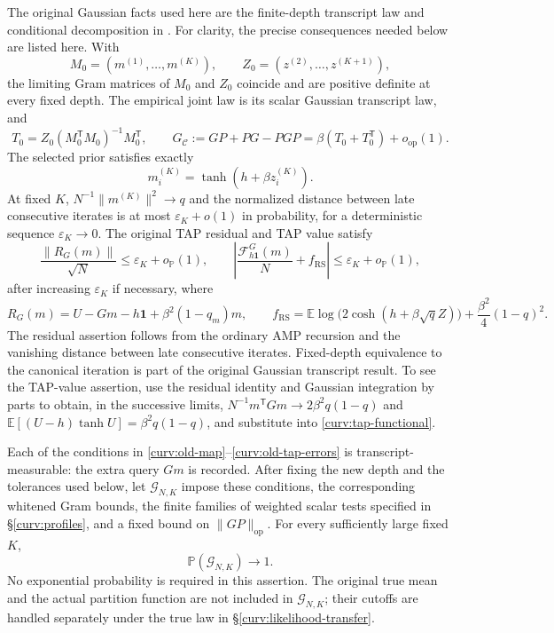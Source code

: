 \documentclass[11pt,reqno]{amsart}
\begin{document}
The original Gaussian facts used here are the finite-depth transcript law
and conditional decomposition in \cite[Section 4]{brennecke2023operator}. For clarity, the
precise consequences needed below are listed here. With
\[
 M_0=(m^{(1)},\ldots,m^{(K)}),\qquad
 Z_0=(z^{(2)},\ldots,z^{(K+1)}),
\]
the limiting Gram matrices of $M_0$ and $Z_0$ coincide and are positive
definite at every fixed depth. The empirical joint law is its scalar
Gaussian transcript law, and
\begin{equation}\label{curv:old-map}
 T_0=Z_0(M_0^{\mathsf T}M_0)^{-1}M_0^{\mathsf T},\qquad
 G_{\mathcal C}:=GP+PG-PGP
       =\beta(T_0+T_0^{\mathsf T})+o_{\mathrm{op}}(1).
\end{equation}
The selected prior satisfies exactly
\begin{equation}\label{curv:old-generating-field}
             m_i^{(K)}=\tanh(h+\beta z_i^{(K)}).
\end{equation}
At fixed $K$, $N^{-1}\|m^{(K)}\|^2\to q$ and the normalized distance
between late consecutive iterates is at most $\varepsilon_K+o(1)$ in
probability, for a deterministic sequence $\varepsilon_K\to0$.
The original TAP residual and TAP value satisfy
\begin{equation}\label{curv:old-tap-errors}
 \frac{\|R_G(m)\|}{\sqrt N}\le\varepsilon_K+o_{\mathbb P}(1),\qquad
 \left|\frac{\mathcal F^G_{h\mathbf1}(m)}N+f_{\mathrm{RS}}\right|
       \le\varepsilon_K+o_{\mathbb P}(1),
\end{equation}
after increasing $\varepsilon_K$ if necessary, where
\[
 R_G(m)=U-Gm-h\mathbf1+\beta^2(1-q_m)m,
 \qquad
 f_{\mathrm{RS}}
   =\mathbb E\log\bigl(2\cosh(h+\beta\sqrt q Z)\bigr)
                         +\frac{\beta^2}{4}(1-q)^2.
\]
The residual assertion follows from the ordinary AMP recursion and the
vanishing distance between late consecutive iterates. Fixed-depth
equivalence to the canonical iteration is part of the original Gaussian
transcript result. To see the TAP-value assertion, use the residual
identity and Gaussian integration by parts to obtain, in the successive
limits,
$N^{-1}m^{\mathsf T}Gm\to2\beta^2q(1-q)$ and
$\mathbb E[(U-h)\tanh U]=\beta^2q(1-q)$, and substitute into
\eqref{curv:tap-functional}.

Each of the conditions in \eqref{curv:old-map}--\eqref{curv:old-tap-errors}
is transcript-measurable: the extra query $Gm$ is recorded. After fixing
the new depth and the tolerances used below, let $\mathcal G_{N,K}$ impose
these conditions, the corresponding whitened Gram bounds, the finite
families of weighted scalar tests specified in
\S\ref{curv:profiles}, and a fixed bound on $\|GP\|_{\mathrm{op}}$.
For every sufficiently large fixed $K$,
\begin{equation*}
             \mathbb P(\mathcal G_{N,K})\longrightarrow1.
\end{equation*}
No exponential probability is required in this assertion. The original
true mean and the actual partition function are not included in
$\mathcal G_{N,K}$; their cutoffs are handled separately under the true
law in \S\ref{curv:likelihood-transfer}.
\end{document}
